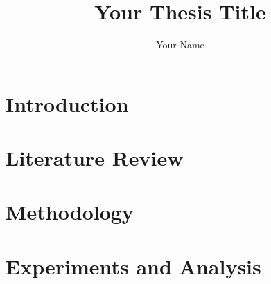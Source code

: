\documentclass[a4paper]{ustthesis}
\title{Your Thesis Title}
\author{Your Name}
\begin{document}
\maketitle

% 

\acknowledgments

\endacknowledgments
\newpage

\tableofcontents



\chapter{Introduction}
\label{chp_intro}

\newpage

\chapter{Literature Review}
\label{chp_review}

\newpage

\chapter{Methodology}
\label{chp_method}

\newpage

\chapter{Experiments and Analysis}
\label{chp_exp}


\newpage
\end{document}
